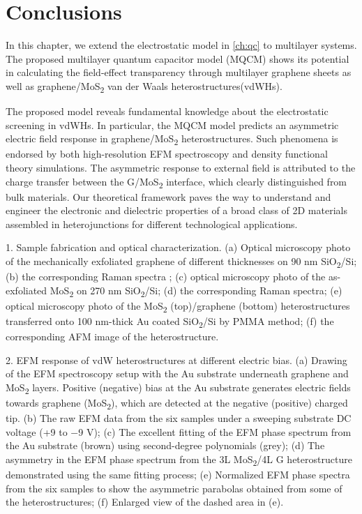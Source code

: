 \section{Conclusions}
\label{sec:asym-conclusions}


In this chapter, we extend the electrostatic model in \autoref{ch:qc}
to multilayer systems. The proposed multilayer quantum capacitor model
(MQCM) shows its potential in calculating the field-effect
transparency through multilayer graphene sheets as well as
graphene/MoS\textsubscript{2} van der Waals heterostructures(vdWHs). 

The proposed model reveals fundamental knowledge about the
electrostatic screening in vdWHs.
In particular, the MQCM model predicts an
asymmetric electric field response in
graphene/MoS\textsubscript{2} heterostructures. Such phenomena is endorsed by
both high-resolution EFM spectroscopy
and density functional theory simulations.
%
The asymmetric response to external field is attributed to the charge transfer between the G/MoS\textsubscript{2} interface, which clearly distinguished from bulk materials.
%
Our theoretical framework paves the way to
understand and engineer the electronic and dielectric properties of a
broad class of 2D materials assembled in heterojunctions for different
technological applications.


 
 1. Sample fabrication and optical characterization. (a) Optical microscopy photo of the mechanically exfoliated graphene of different thicknesses on 90 nm SiO\textsubscript{2}/Si; (b) the corresponding Raman spectra ; (c) optical microscopy photo of the as-exfoliated MoS\textsubscript{2} on 270 nm SiO\textsubscript{2}/Si; (d) the corresponding Raman spectra; (e) optical microscopy photo of the MoS\textsubscript{2} (top)/graphene (bottom) heterostructures transferred onto 100 nm-thick Au coated SiO\textsubscript{2}/Si by PMMA method; (f) the corresponding AFM image of the heterostructure.
 
 2. EFM response of vdW heterostructures at different electric bias. (a) Drawing of the EFM spectroscopy setup with the Au substrate underneath graphene and MoS\textsubscript{2} layers. Positive (negative) bias at the Au substrate generates electric fields towards graphene (MoS\textsubscript{2}), which are detected at the negative (positive) charged tip. (b) The raw EFM data from the six samples under a sweeping substrate DC voltage (+9 to −9 V); (c) The excellent fitting of the EFM phase spectrum from the Au substrate (brown) using second-degree polynomials (grey); (d) The asymmetry in the EFM phase spectrum from the 3L MoS\textsubscript{2}/4L G heterostructure demonstrated using the same fitting process; (e) Normalized EFM phase spectra from the six samples to show the asymmetric parabolas obtained from some of the heterostructures; (f) Enlarged view of the dashed area in (e).
 
